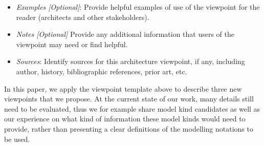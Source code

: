 \begin{itemize}
\item {\em Examples [Optional]}: 
Provide helpful examples of use of the viewpoint for the reader
(architects and other stakeholders).
\item {\em Notes [Optional]} Provide any additional information that users of the viewpoint may
need or find helpful.
\item {\em Sources}: Identify sources for this architecture viewpoint, if any,
  including author, history, bibliographic references, prior art, etc.
\end{itemize}

In this paper, we apply the viewpoint template above to describe three new viewpoints that we propose.
At the current state of our work, many details still need to be evaluated,
thus we for example share model kind candidates
as well as our experience on what kind of information these model kinds would need to provide,
rather than presenting a clear definitions of the modelling notations to be used.

